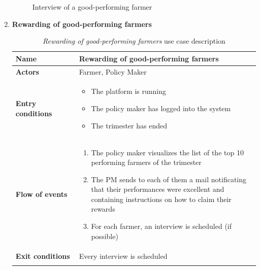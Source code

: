 \documentclass[10pt]{article}
\begin{document}
\begin{enumerate}[label=\textbf{UC\arabic*}]
\begin{figure}[ht!]
            \caption{Interview of a good-performing farmer}
        \end{figure}
    \newpage
    \item \label{uc:uc7} \textbf{Rewarding of good-performing farmers}
        \begin{longtable}{p{0.26\linewidth}p{0.75\linewidth}}
            \toprule
            \textbf{Name} & \textbf{Rewarding of good-performing farmers} \\
            \midrule
            \textbf{Actors} & Farmer, Policy Maker\\
            \midrule
            \textbf{Entry conditions} & 
            \begin{itemize}
                \item The platform is running
                \item The policy maker has logged into the system
                \item The trimester has ended
            \end{itemize}\\
            \midrule
            \textbf{Flow of events} & 
            \begin{enumerate}
                \item The policy maker visualizes the list of the top 10 performing farmers of the trimester
                \item The PM sends to each of them a mail notificating that their performances were excellent and containing instructions on how to claim their rewards
                \item For each farmer, an interview is scheduled (if possible)
            \end{enumerate} \\
            \midrule
            \textbf{Exit conditions} & Every interview is scheduled\\
            \midrule
            \bottomrule
            \caption{\emph{Rewarding of good-performing farmers} use case description}
        \end{longtable}
    \newpage
        \begin{figure}[ht!]
            \centering

\end{figure}
\end{enumerate}
\end{document}
